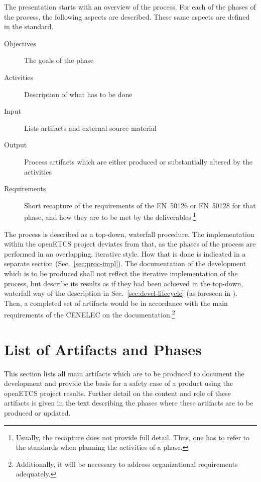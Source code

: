 \documentclass{template/openetcs_article}
\begin{document}
The presentation starts with an overview of the process. 
For each of the phases of the process, the following aspects are
described. These same aspects are defined in the standard.
\begin{description}
\item[Objectives] The goals of the phase
\item[Activities] Description of what has to be done
\item[Input] Lists artifacts and external source material
\item[Output] Process artifacts which are either produced or
  substantially altered by the activities
\item[Requirements] Short recapture of the
  requirements of the EN~50126 or EN~50128 for that phase, and how
  they are to be met by the deliverables.\footnote{Usually, the recapture does
    not provide full detail. Thus, one has to refer to the standards
    when planning the activities of a phase.}
\end{description}
%
The process is described as a top-down, waterfall procedure. The
implementation within the openETCS project deviates from that, as the
phases of the process are performed in an overlapping, iterative
style. How that is done is indicated in a separate section
(Sec.~\ref{sec:proc-impl}). The documentation of the development which
is to be produced shall not reflect the iterative implementation of
the process, but describe its results as if they had been achieved in
the top-down, waterfall way of the description in
Sec.~\ref{sec:devel-lifecycle} (as foreseen in
\cite[7.1.2.2]{EN50128:2011}). Then, a completed set of artifacts
would be in accordance with the main requirements of the CENELEC on
the documentation.\footnote{Additionally, it will be necessary to
  address organizational requirements adequately.}




\section{List of Artifacts and Phases}
\label{sec:list-artifacts}
This section lists all main artifacts which are to be produced to
document the development and provide the basis for a safety case of a
product using the openETCS project results. Further detail on the
content and role of these artifacts is given in the text describing
the phases where these artifacts are to be produced or updated.
\end{document}
